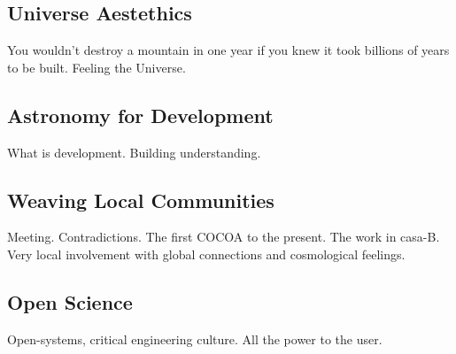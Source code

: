 \documentclass[a4paper,10pt]{article} %
\begin{document}
\subsection{Universe Aestethics}

You wouldn't destroy a mountain in one year if you knew it took
billions of years  to be built.
Feeling the Universe.

\subsection{Astronomy for Development}

What is development.
Building understanding.


\subsection{Weaving Local Communities}

Meeting.
Contradictions.
The first COCOA to the present.
The work in casa-B. Very local involvement with global connections and
cosmological feelings.

\subsection{Open Science}
Open-systems, critical engineering culture. All the power to the
user. 
\end{document}
